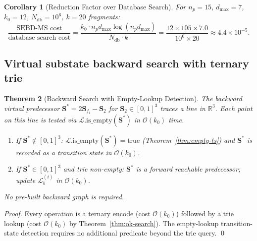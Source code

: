 \documentclass[twocolumn,10pt,a4paper]{article}
\theoremstyle{thmstyle}
\newtheorem{theorem}{Theorem}[section]
\newtheorem{corollary}[theorem]{Corollary}
\theoremstyle{definition}
\theoremstyle{remark}
\newcommand{\R}{\mathbb{R}}
\newcommand{\Sv}{\mathbf{S}}
\begin{document}
\begin{corollary}[Reduction Factor over Database Search]
\label{cor:reduction}
For $n_p = 15$, $d_\text{max} = 7$, $k_0 = 12$, $N_\text{db} = 10^6$,
$k = 20$ fragments:
\begin{equation}
\frac{\text{SEBD-MS cost}}{\text{database search cost}}
= \frac{k_0 \cdot n_p d_\text{max} \log(n_p d_\text{max})}
       {N_\text{db} \cdot k}
= \frac{12 \times 105 \times 7.0}{10^6 \times 20} \approx 4.4 \times 10^{-5}.
\end{equation}
\end{corollary}

\subsection{Virtual substate backward search with ternary trie}

\begin{theorem}[Backward Search with Empty-Lookup Detection]
\label{thm:backward-reduction}
The backward virtual predecessor
$\Sv^* = 2\Sv_{f_i} - \Sv_2$ for $\Sv_2 \in [0,1]^3$
traces a line in $\R^3$. Each point on this line is tested via
$\mathcal{L}.\text{is\_empty}(\Sv^*)$ in $\mathcal{O}(k_0)$ time.
\begin{enumerate}[nosep,label=(\roman*)]
\item If $\Sv^* \notin [0,1]^3$: $\mathcal{L}.\text{is\_empty}(\Sv^*)
  = \text{true}$ (Theorem~\ref{thm:empty-ts}) and $\Sv^*$ is recorded
  as a transition state in $\mathcal{O}(k_0)$.
\item If $\Sv^* \in [0,1]^3$ and trie non-empty: $\Sv^*$ is a forward
  reachable predecessor; update $\mathcal{L}_b^{(i)}$ in
  $\mathcal{O}(k_0)$.
\end{enumerate}
No pre-built backward graph is required.
\end{theorem}

\begin{proof}
Every operation is a ternary encode (cost $\mathcal{O}(k_0)$)
followed by a trie lookup (cost $\mathcal{O}(k_0)$ by
Theorem~\ref{thm:ok-search}). The empty-lookup transition-state
detection requires no additional predicate beyond the trie query.
\qed
\end{proof}
\end{document}

